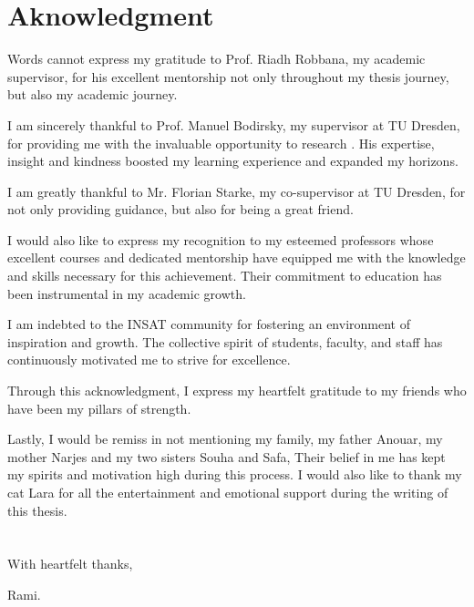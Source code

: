 \chapter*{Aknowledgment}

Words cannot express my gratitude to Prof. Riadh Robbana, my academic supervisor, for his excellent mentorship not only throughout my thesis journey, but also my academic journey.

I am sincerely thankful to Prof. Manuel Bodirsky, my supervisor at TU Dresden, for
providing me with the invaluable opportunity to research . His expertise, insight and kindness boosted my learning
experience and expanded my horizons.

I am greatly thankful to Mr. Florian Starke, my co-supervisor at TU Dresden, for not only providing guidance, but also for being a great friend.

I would also like to express my recognition to my esteemed professors whose excellent courses and dedicated mentorship have equipped me with the knowledge and
skills necessary for this achievement. Their commitment to education has been instrumental in my academic growth.

I am indebted to the INSAT community for fostering an environment of
inspiration and growth. The collective spirit of students, faculty, and staff has continuously motivated me to strive for excellence.

Through this acknowledgment, I express my heartfelt gratitude to my friends who have been my pillars of strength.

Lastly, I would be remiss in not mentioning my family, my father Anouar, my mother Narjes and my two sisters Souha and Safa, Their belief in me has kept my spirits and motivation high during this process. I would also like to thank my cat Lara for all the entertainment and emotional support during the writing of this thesis.
\\
\\
\\
With heartfelt thanks,

Rami.




